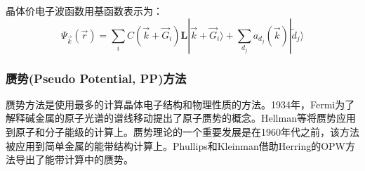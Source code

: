 晶体价电子波函数用基函数表示为：
\begin{equation}
  \Psi_{\vec k}(\vec r)=\sum_iC(\vec k+\vec G_i)\mathbf L|\vec k+\vec G_i\rangle+\sum_{d_j}a_{d_j}(\vec k)|\tilde d_j\rangle
  \label{eq:solid-95}
\end{equation}

\subsubsection{赝势(Pseudo Potential, PP)方法}
赝势方法是使用最多的计算晶体电子结构和物理性质的方法。1934年，Fermi为了解释碱金属的原子光谱的谱线移动提出了原子赝势的概念\cite{nc11-157_1934,ajp52-695_1984}。Hellman等将赝势应用到原子和分子能级的计算上\cite{jcp3-61_1935}。赝势理论的一个重要发展是在1960年代之前，该方法被应用到简单金属的能带结构计算上。Phullips和Kleinman借助Herring的OPW方法导出了能带计算中的赝势\cite{pr116-287_1959}。

